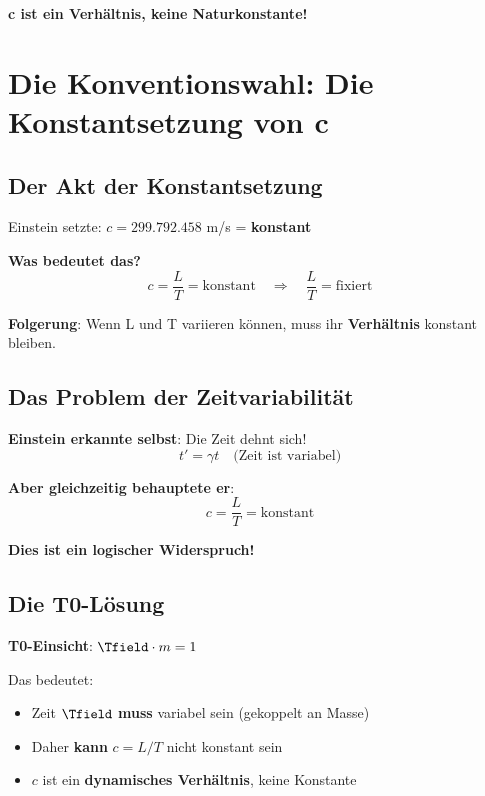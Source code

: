	\textbf{c ist ein Verhältnis, keine Naturkonstante!}
	
	\section{Die Konventionswahl: Die Konstantsetzung von c}
	
	\subsection{Der Akt der Konstantsetzung}
	
	Einstein setzte: $c = 299.792.458$ m/s = \textbf{konstant}
	
	\textbf{Was bedeutet das?}
	\begin{equation}
		c = \frac{L}{T} = \text{konstant} \quad \Rightarrow \quad \frac{L}{T} = \text{fixiert}
	\end{equation}
	
	\textbf{Folgerung}: Wenn L und T variieren können, muss ihr \textbf{Verhältnis} konstant bleiben.
	
	\subsection{Das Problem der Zeitvariabilität}
	
	\textbf{Einstein erkannte selbst}: Die Zeit dehnt sich!
	\begin{equation}
		t' = \gamma t \quad \text{(Zeit ist variabel)}
	\end{equation}
	
	\textbf{Aber gleichzeitig behauptete er}: 
	\begin{equation}
		c = \frac{L}{T} = \text{konstant}
	\end{equation}
	
	\textbf{Dies ist ein logischer Widerspruch!}
	
	\subsection{Die T0-Lösung}
	
	\textbf{T0-Einsicht}: $\Tfield \cdot m = 1$
	
	Das bedeutet:
	\begin{itemize}
		\item Zeit $\Tfield$ \textbf{muss} variabel sein (gekoppelt an Masse)
		\item Daher \textbf{kann} $c = L/T$ nicht konstant sein
		\item $c$ ist ein \textbf{dynamisches Verhältnis}, keine Konstante
	\end{itemize}
	
